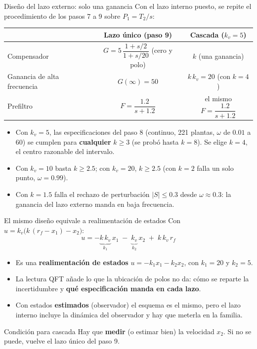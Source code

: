 \documentclass[aspectratio=169,11pt]{beamer}
\begin{document}
\begin{frame}{Diseño del lazo externo: solo una ganancia}
  \small
  Con el lazo interno puesto, se repite el procedimiento de los pasos 7 a 9 sobre $P_1=T_2/s$:
  \begin{center}
  \begin{tabular}{l|c|c}
    & Lazo único (paso 9) & Cascada ($k_v=5$)\\\hline
    Compensador & $G=5\,\dfrac{1+s/2}{1+s/20}$ (cero y polo) & $k$ (una ganancia)\\[4pt]
    Ganancia de alta frecuencia & $G(\infty)=50$ & $k\,k_v=20$ (con $k=4$)\\[2pt]
    Prefiltro & $F=\dfrac{1.2}{s+1.2}$ & el mismo $F=\dfrac{1.2}{s+1.2}$
  \end{tabular}
  \end{center}
  \begin{itemize}
    \item Con $k_v=5$, las especificaciones del paso 8 (continuo, 221 plantas, $\omega$ de $0.01$ a $60$) se cumplen para \textbf{cualquier} $k\ge3$ (se probó hasta $k=8$). Se elige $k=4$, el centro razonable del intervalo.
    \item Con $k_v=10$ basta $k\ge2.5$; con $k_v=20$, $k\ge2.5$ (con $k=2$ falla un solo punto, $\omega=0.99$).
    \item Con $k=1.5$ falla el rechazo de perturbación $|S|\le0.3$ desde $\omega\approx0.3$: la ganancia del lazo externo manda en baja frecuencia.
  \end{itemize}
\end{frame}

\begin{frame}{El mismo diseño equivale a realimentación de estados}
  \small
  Con $u=k_v\big(k\,(r_f-x_1)-x_2\big)$:
  \[ u=-\underbrace{k\,k_v}_{k_1}\,x_1\;-\;\underbrace{k_v}_{k_2}\,x_2\;+\;k\,k_v\,r_f \]
  \begin{itemize}
    \item Es una \textbf{realimentación de estados} $u=-k_1x_1-k_2x_2$, con $k_1=20$ y $k_2=5$.
    \item La lectura QFT añade lo que la ubicación de polos no da: cómo se reparte la incertidumbre y \textbf{qué especificación manda en cada lazo}.
    \item Con estados \textbf{estimados} (observador) el esquema es el mismo, pero el lazo interno incluye la dinámica del observador y hay que meterla en la familia.
  \end{itemize}
  \begin{alertblock}{Condición para cascada}
    Hay que \textbf{medir} (o estimar bien) la velocidad $x_2$. Si no se puede, vuelve el lazo único del paso 9.
  \end{alertblock}
\end{frame}
\end{document}
